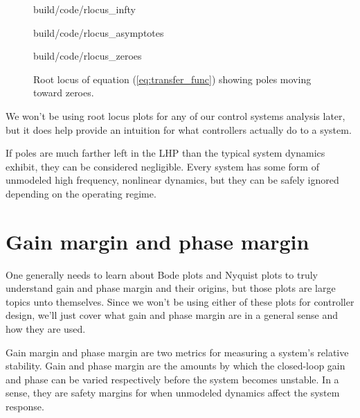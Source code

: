 \begin{figure}
  \begin{minisvg}{build/code/rlocus_infty}
    \caption{Root locus showing pole moving toward negative infinity}
    \label{fig:rlocus_infty}
  \end{minisvg}
  \hfill
  \begin{minisvg}{build/code/rlocus_asymptotes}
    \caption{Root locus showing poles moving toward asymptotes}
    \label{fig:rlocus_asymptotes}
  \end{minisvg}
  \begin{minisvg}{build/code/rlocus_zeroes}
    \caption{Root locus of equation (\ref{eq:transfer_func}) showing poles
      moving toward zeroes.}
    \label{fig:rlocus_zeroes}
  \end{minisvg}
\end{figure}

We won't be using root locus plots for any of our control systems analysis
later, but it does help provide an intuition for what controllers actually do to
a system.

\begin{remark}
  If poles are much farther left in the LHP than the typical \gls{system}
  dynamics exhibit, they can be considered negligible. Every \gls{system} has
  some form of unmodeled high frequency, nonlinear dynamics, but they can be
  safely ignored depending on the operating regime.
\end{remark}

\section{Gain margin and phase margin} \label{sec:gain-phase-margin}

One generally needs to learn about Bode plots and Nyquist plots to truly
understand gain and phase margin and their origins, but those plots are large
topics unto themselves. Since we won't be using either of these plots for
controller design, we'll just cover what gain and phase margin are in a general
sense and how they are used.

Gain margin and phase margin are two metrics for measuring a system's relative
stability. Gain and phase margin are the amounts by which the closed-loop gain
and phase can be varied respectively before the system becomes unstable. In a
sense, they are safety margins for when unmodeled dynamics affect the system
response.

